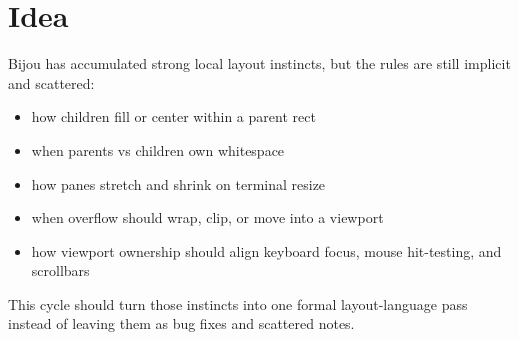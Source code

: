 \section{Idea}\label{record-297-idea}

Bijou has accumulated strong local layout instincts, but the rules are still implicit and scattered:

\begin{itemize}
\tightlist
\item
  how children fill or center within a parent rect
\item
  when parents vs children own whitespace
\item
  how panes stretch and shrink on terminal resize
\item
  when overflow should wrap, clip, or move into a viewport
\item
  how viewport ownership should align keyboard focus, mouse hit-testing, and scrollbars
\end{itemize}

This cycle should turn those instincts into one formal layout-language pass instead of leaving them as bug fixes and scattered notes.

